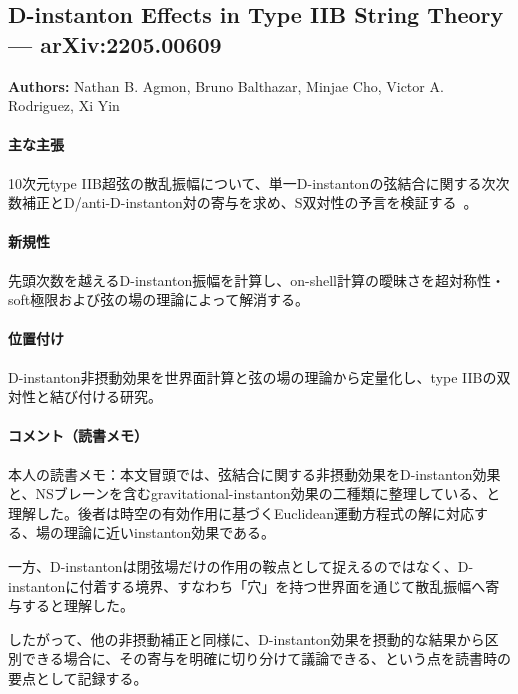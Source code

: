 \subsection{D-instanton Effects in Type IIB String Theory --- arXiv:2205.00609}

\textbf{Authors:} Nathan B. Agmon, Bruno Balthazar, Minjae Cho, Victor A. Rodriguez, Xi Yin

\paragraph{主な主張}
10次元type IIB超弦の散乱振幅について、単一D-instantonの弦結合に関する次次数補正とD/anti-D-instanton対の寄与を求め、S双対性の予言を検証する~\cite{Agmon:2022vdj}。

\paragraph{新規性}
先頭次数を越えるD-instanton振幅を計算し、on-shell計算の曖昧さを超対称性・soft極限および弦の場の理論によって解消する。

\paragraph{位置付け}
D-instanton非摂動効果を世界面計算と弦の場の理論から定量化し、type IIBの双対性と結び付ける研究。

\paragraph{コメント（読書メモ）}
本人の読書メモ：本文冒頭では、弦結合に関する非摂動効果をD-instanton効果と、NSブレーンを含むgravitational-instanton効果の二種類に整理している、と理解した。後者は時空の有効作用に基づくEuclidean運動方程式の解に対応する、場の理論に近いinstanton効果である。

一方、D-instantonは閉弦場だけの作用の鞍点として捉えるのではなく、D-instantonに付着する境界、すなわち「穴」を持つ世界面を通じて散乱振幅へ寄与すると理解した。

したがって、他の非摂動補正と同様に、D-instanton効果を摂動的な結果から区別できる場合に、その寄与を明確に切り分けて議論できる、という点を読書時の要点として記録する。
